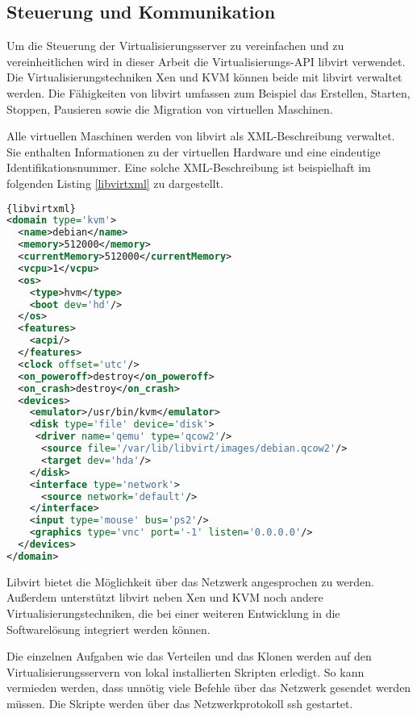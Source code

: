 \subsection{Steuerung und Kommunikation}
Um die Steuerung der Virtualisierungsserver zu vereinfachen und zu vereinheitlichen wird in dieser Arbeit die Virtualisierungs-API libvirt verwendet. Die Virtualisierungstechniken Xen und KVM können beide mit libvirt verwaltet werden. Die Fähigkeiten von libvirt umfassen zum Beispiel das Erstellen, Starten, Stoppen, Pausieren sowie die Migration von virtuellen Maschinen. 

Alle virtuellen Maschinen werden von libvirt als XML-Beschreibung verwaltet. Sie enthalten Informationen zu der virtuellen Hardware und eine eindeutige Identifikationsnummer. Eine solche XML-Beschreibung ist beispielhaft im folgenden Listing \ref{libvirtxml} zu dargestellt.
\\
\begin{lstlisting}[caption=libvirt-XML Beispiel,language=XML,label=libvirtxml]{libvirtxml}
<domain type='kvm'>
  <name>debian</name>
  <memory>512000</memory>
  <currentMemory>512000</currentMemory>
  <vcpu>1</vcpu>
  <os>
    <type>hvm</type>
    <boot dev='hd'/>
  </os>
  <features>
    <acpi/>
  </features>
  <clock offset='utc'/>
  <on_poweroff>destroy</on_poweroff>
  <on_crash>destroy</on_crash>
  <devices>
    <emulator>/usr/bin/kvm</emulator>
    <disk type='file' device='disk'>
     <driver name='qemu' type='qcow2'/>
      <source file='/var/lib/libvirt/images/debian.qcow2'/>
      <target dev='hda'/>
    </disk>
    <interface type='network'>
      <source network='default'/>
    </interface>
    <input type='mouse' bus='ps2'/>
    <graphics type='vnc' port='-1' listen='0.0.0.0'/>
  </devices>
</domain>
\end{lstlisting}

Libvirt bietet die Möglichkeit über das Netzwerk angesprochen zu werden. Außerdem unterstützt libvirt neben Xen und KVM noch andere Virtualisierungstechniken, die bei einer weiteren Entwicklung in die Softwarelösung integriert werden können. %

Die einzelnen Aufgaben wie das Verteilen und das Klonen werden auf den Virtualisierungsservern von lokal installierten Skripten erledigt. So kann vermieden werden, dass unnötig viele Befehle über das Netzwerk gesendet werden müssen. Die Skripte werden über das Netzwerkprotokoll ssh gestartet.


